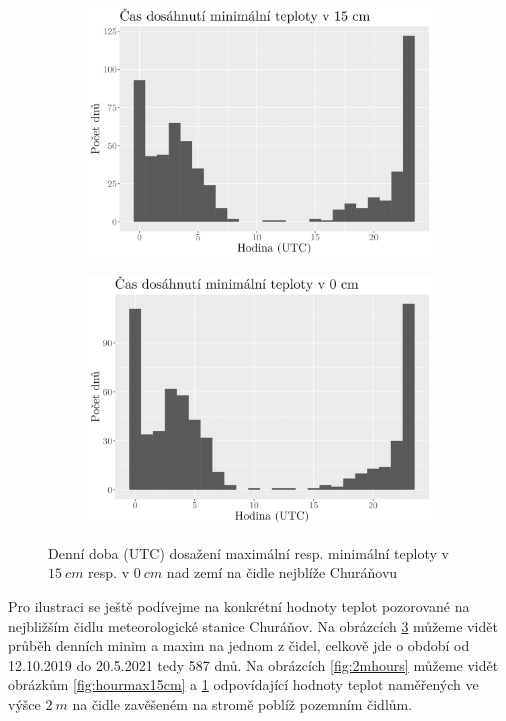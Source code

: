 \begin{figure}
\begin{subfigure}{0.45\textwidth}
  \includegraphics[width=\textwidth]{img/hist_hourmin15cm.png}
		\caption{}
		\label{fig:hourmin15cm}
	\end{subfigure}
	\hfill
	\begin{subfigure}{0.45\textwidth}
  \includegraphics[width=\textwidth]{img/hist_hourmin0cm.png}
		\caption{}
		\label{fig:hourmin0cm}
	\end{subfigure}
	\caption{Denní doba (UTC) dosažení maximální resp. minimální teploty v $\SI{15}{cm}$ resp. v $\SI{0}{cm}$ nad zemí na čidle nejblíže Churáňovu}
	\label{fig:hours}
\end{figure}

Pro ilustraci se ještě podívejme na konkrétní hodnoty teplot pozorované na nejbližším čidlu meteorologické stanice Churáňov. Na obrázcích \ref{fig:hours} můžeme vidět průběh denních minim a maxim na jednom z čidel, celkově jde o období od 12.10.2019 do 20.5.2021 tedy 587 dnů. Na obrázcích \ref{fig:2mhours} můžeme vidět obrázkům \ref{fig:hourmax15cm} a \ref{fig:hourmin15cm} odpovídající hodnoty teplot naměřených ve výšce $\SI{2}{m}$ na čidle zavěšeném na stromě poblíž pozemním čidlům.

